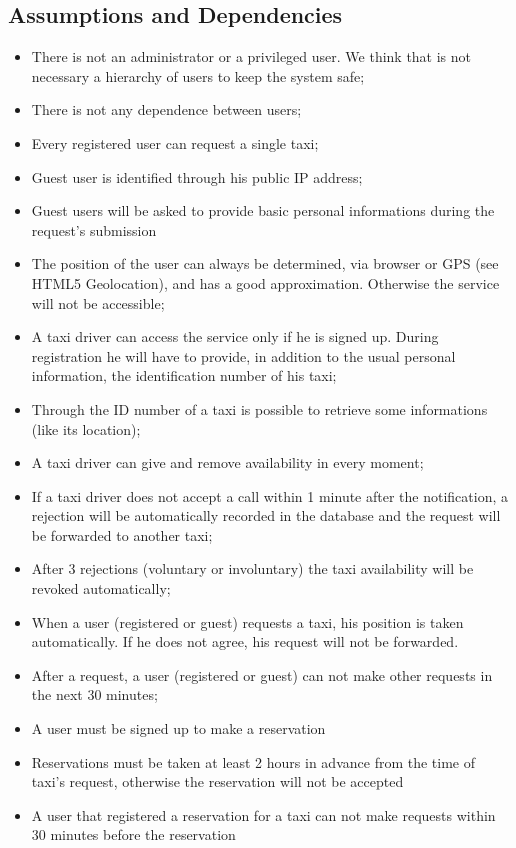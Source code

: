 \documentclass{article}
\begin{document}
	\subsection{Assumptions and Dependencies}
		\begin{itemize}
			\item There is not an administrator or a privileged user. We think that is not
			necessary a hierarchy of users to keep the system safe;
			\item There is not any dependence between users;
			\item Every registered user can request a single taxi;
			\item Guest user is identified through his public IP address;
			\item Guest users will be asked to provide basic personal informations during the
			request's submission
			\item The position of the user can always be determined, via browser or GPS
			(see HTML5 Geolocation), and has a good approximation. Otherwise the service will not
			be accessible;
			\item A taxi driver can access the service only if he is signed up. During
			registration he will have to provide, in addition to the usual personal information,
			the identification number of his taxi;
			\item Through the ID number of a taxi is possible to retrieve some informations (like
			its location);
			\item A taxi driver can give and remove availability in every moment;
			\item If a taxi driver does not accept a call within 1 minute after the notification,
			a rejection will be automatically recorded in the database and the request will be
			forwarded to another taxi;
			\item After 3 rejections (voluntary or involuntary) the taxi availability will be 
			revoked automatically;
			\item When a user (registered or guest) requests a taxi, his position is taken automatically.
			If he does not agree, his request will not be forwarded.
			\item After a request, a user (registered or guest) can not make other requests in the next 30 minutes;
			\item A user must be signed up to make a reservation
			\item Reservations must be taken at least 2 hours in advance from the time of taxi's request,
			otherwise the reservation will not be accepted
			\item A user that registered a reservation for a taxi can not make requests within 30 minutes
			before the reservation
		\end{itemize}
\end{document}

